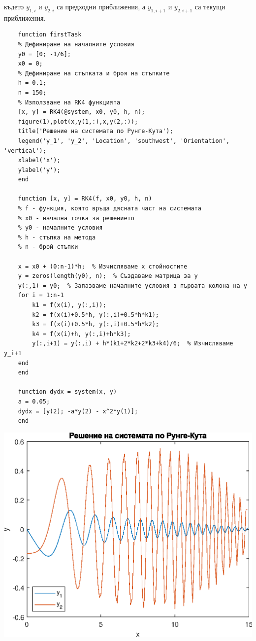 \documentclass[a4paper,fleqn,12pt]{article}
\begin{document}
където $y_{1,i}$ и $y_{2,i}$ са предходни приближения, а $y_{1,i+1}$ и $y_{2,i+1}$ са текущи приближения. \\
	\newpage
	\begin{verbatim}
	function firstTask
	% Дефиниране на началните условия
	y0 = [0; -1/6];
	x0 = 0;
	% Дефиниране на стъпката и броя на стъпките
	h = 0.1;
	n = 150;
	% Използване на RK4 функцията
	[x, y] = RK4(@system, x0, y0, h, n);
	figure(1),plot(x,y(1,:),x,y(2,:));
	title('Решение на системата по Рунге-Кута');
	legend('y_1', 'y_2', 'Location', 'southwest', 'Orientation', 'vertical');
	xlabel('x');
	ylabel('y');
	end
	
	function [x, y] = RK4(f, x0, y0, h, n)
	% f - функция, която връща дясната част на системата
	% x0 - начална точка за решението
	% y0 - началните условия
	% h - стъпка на метода
	% n - брой стъпки
	
	x = x0 + (0:n-1)*h;  % Изчисляваме x стойностите
	y = zeros(length(y0), n);  % Създаваме матрица за y
	y(:,1) = y0;  % Запазваме началните условия в първата колона на y
	for i = 1:n-1
	    k1 = f(x(i), y(:,i));
	    k2 = f(x(i)+0.5*h, y(:,i)+0.5*h*k1);
	    k3 = f(x(i)+0.5*h, y(:,i)+0.5*h*k2);
	    k4 = f(x(i)+h, y(:,i)+h*k3);
	    y(:,i+1) = y(:,i) + h*(k1+2*k2+2*k3+k4)/6;  % Изчисляваме y_i+1
	end
	end
	
	function dydx = system(x, y)
	a = 0.05;
	dydx = [y(2); -a*y(2) - x^2*y(1)];
	end
	\end{verbatim}

\includegraphics{firstTask_01.eps}
\end{document}
